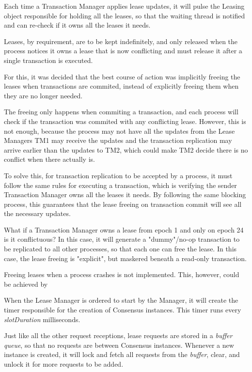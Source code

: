 \documentclass[times, 10pt,twocolumn]{article}
\begin{document}
Each time a Transaction Manager applies lease updates, it will pulse the Leasing object responsible for holding
all the leases, so that the waiting thread is notified and can re-check if it owns all the leases it needs.

Leases, by requirement, are to be kept indefinitely, and only released when the process notices
it owns a lease that is now conflicting and must release it after a single transaction is executed.

For this, it was decided that the best course of action was implicitly freeing the leases when
transactions are commited, instead of explicitly freeing them when they are no longer needed.

The freeing only happens when commiting a transaction, and each process will check if the transaction
was commited with any conflicting lease. However, this is not enough, because the process may not
have all the updates from the Lease Managers \textendash TM1 may receive the updates and the transaction
replication may arrive earlier than the updates to TM2, which could make TM2 decide there is no conflict
when there actually is.

To solve this, for transaction replication to be accepted by a process, it must follow the same rules
for executing a transaction, which is verifying the sender Transaction Manager owns all the leases it needs.
By following the same blocking process, this guarantees that the lease freeing on transaction commit will
see all the necessary updates. %

What if a Transaction Manager owns a lease from epoch 1 and only on epoch 24 is it conflictuous?
In this case, it will generate a "dummy"/no-op transaction to be replicated to all other processes,
so that each one can free the lease. In this case, the lease freeing is "explicit", but maskered
beneath a read-only transaction.

Freeing leases when a process crashes is not implemented. This, however, could be achieved by



When the Lease Manager is ordered to start by the Manager, it will create the
timer responsible for the creation of Consensus instances.
This timer runs every \textit{slotDuration} milliseconds.

Just like all the other request receptions, lease requests are stored in a \textit{buffer queue},
so that no requests are between Consensus instances. Whenever a new instance is created,
it will lock and fetch all requests from the \textit{buffer}, clear, and unlock it for more
requests to be added.
\end{document}
